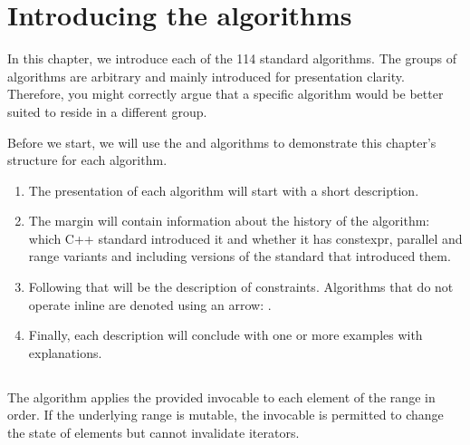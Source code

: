 \section{Introducing the algorithms}

In this chapter, we introduce each of the 114 standard algorithms. The groups of algorithms are arbitrary and mainly introduced for presentation clarity. Therefore, you might correctly argue that a specific algorithm would be better suited to reside in a different group.

Before we start, we will use the  and  algorithms to demonstrate this chapter's structure for each algorithm.

\begin{enumerate}[label=\protect\circled{\arabic*}]
    \item The presentation of each algorithm will start with a short description.
    \item The margin will contain information about the history of the algorithm: which C++ standard introduced it and whether it has constexpr, parallel and range variants and including versions of the standard that introduced them.
    \item Following that will be the description of constraints. Algorithms that do not operate inline are denoted using an arrow: .
    \item Finally, each description will conclude with one or more examples with explanations.
\end{enumerate}

\subsection{\texorpdfstring{}{\texttt{std::for\_each}}}

 The  algorithm applies the provided invocable to each element of the range in order. If the underlying range is mutable, the invocable is permitted to change the state of elements but cannot invalidate iterators.


